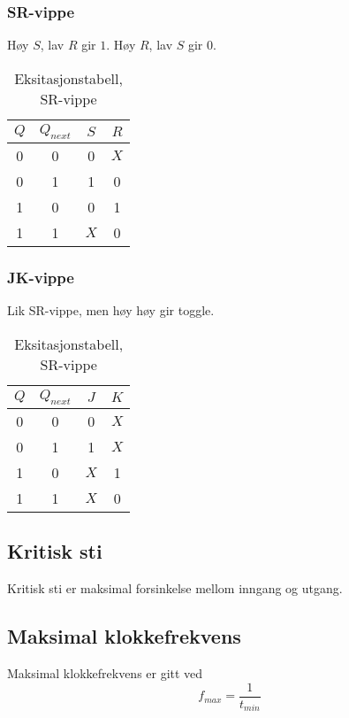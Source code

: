 \documentclass{article}
\begin{document}
\subsubsection{SR-vippe}
Høy $S$, lav $R$ gir $1$. Høy $R$, lav $S$ gir $0$. 
\begin{table}[h]
    \centering
    \begin{tabular}{c|c|c|c}
    $Q$ & $Q_{next}$ & $S$ & $R$\\
    \hline
    0 & 0 & 0 & $X$\\
    0 & 1 & 1 & 0\\
    1 & 0 & 0 & 1\\
    1 & 1 & $X$ & 0
    \end{tabular}
    \caption{Eksitasjonstabell, SR-vippe}
\end{table}

\subsubsection{JK-vippe}
Lik SR-vippe, men høy høy gir toggle.
\begin{table}[h]
    \centering
    \begin{tabular}{c|c|c|c}
    $Q$ & $Q_{next}$ & $J$ & $K$\\
    \hline
    0 & 0 & 0 & $X$\\
    0 & 1 & 1 & $X$\\
    1 & 0 & $X$ & 1\\
    1 & 1 & $X$ & 0
    \end{tabular}
    \caption{Eksitasjonstabell, SR-vippe}
\end{table}

\subsection{Kritisk sti}
Kritisk sti er maksimal forsinkelse mellom inngang og utgang.

\subsection{Maksimal klokkefrekvens}
Maksimal klokkefrekvens er gitt ved
\[f_{max} = \frac{1}{t_{min}} \]
\end{document}
